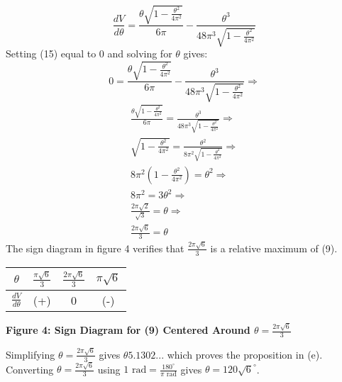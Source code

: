 \documentclass{article}
\begin{document}
\begin{itemize}
    \begin{equation}
        \frac{dV}{d\theta}=\frac{\theta\sqrt{1-\frac{\theta^2}{4\pi^2}}}{6\pi}-\frac{\theta^3}{48\pi^3\sqrt{1-\frac{\theta^2}{4\pi^2}}}
    \end{equation}
    Setting (15) equal to 0 and solving for \(\theta\) gives:
    \[0=\frac{\theta\sqrt{1-\frac{\theta^2}{4\pi^2}}}{6\pi}-\frac{\theta^3}{48\pi^3\sqrt{1-\frac{\theta^2}{4\pi^2}}}\Rightarrow\]
    \begin{align*}
        \frac{\theta\sqrt{1-\frac{\theta^2}{4\pi^2}}}{6\pi} = \frac{\theta^3}{48\pi^3\sqrt{1-\frac{\theta^2}{4\pi^2}}}\Rightarrow\\
        \sqrt{1-\frac{\theta^2}{4\pi^2}} = \frac{\theta^2}{8\pi^2\sqrt{1-\frac{\theta^2}{4\pi^2}}}\Rightarrow\\
        8\pi^2\left(1-\frac{\theta^2}{4\pi^2}\right) = \theta^2\Rightarrow\\
        8\pi^2=3\theta^2\Rightarrow\\
        \frac{2\pi\sqrt{2}}{\sqrt{3}}=\theta\Rightarrow\\
        \frac{2\pi\sqrt{6}}{3}=\theta
    \end{align*}
    \newpage
    The sign diagram in figure 4 verifies that \(\frac{2\pi\sqrt{6}}{3}\) is a relative maximum of (9).
    \begin{center}
\begin{tabular}{ |c||c|c|c| } 
 \hline
 \(\theta\) & \(\frac{\pi\sqrt{6}}{3}\) & \(\frac{2\pi\sqrt{6}}{3}\) & \(\pi\sqrt{6}\) \\ 
 \hline
 \(\frac{dV}{d\theta}\) & (+) & 0 & (-) \\ 
 \hline
\end{tabular}
\end{center}
\begin{center}
    \textbf{Figure 4: Sign Diagram for (9) Centered Around \(\theta=\frac{2\pi\sqrt{6}}{3}\)}
\end{center}
Simplifying \(\theta=\frac{2\pi\sqrt{6}}{3}\) gives \(\theta5.1302...\) which proves the proposition in (e).
\newline Converting \(\theta=\frac{2\pi\sqrt{6}}{3}\) using \(1\mbox{ rad}=\frac{180^\circ}{\pi\mbox{ rad}}\) gives \(\theta=120\sqrt{6}^\circ\).
    

\end{itemize}
\end{document}
